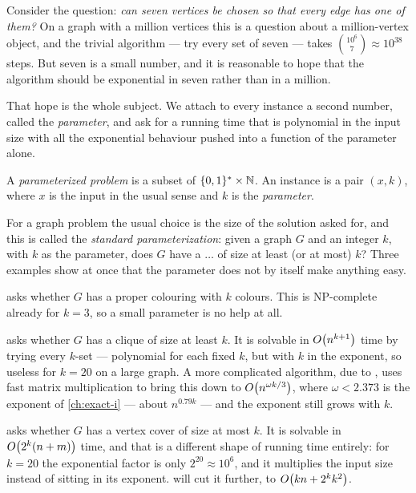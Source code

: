 Consider the question: \emph{can seven vertices be chosen so that every edge has
one of them?} On a graph with a million vertices this is a question about a
million-vertex object, and the trivial algorithm --- try every set of seven ---
takes $\binom{10^6}{7} \approx 10^{38}$ steps. But seven is a small number, and
it is reasonable to hope that the algorithm should be exponential in seven
rather than in a million.

That hope is the whole subject. We attach to every instance a second number,
called the \emph{parameter}, and ask for a running time that is polynomial in
the input size with all the exponential behaviour pushed into a function of the
parameter alone.

\begin{definition}\label{def:fpt-problem}
A \emph{parameterized problem} is a subset of $\{0,1\}^{*} \times \mathbb{N}$. An
instance is a pair $(x,k)$, where $x$ is the input in the usual sense and $k$ is
the \emph{parameter}.
\end{definition}

For a graph problem the usual choice is the size of the solution asked for, and
this is called the \emph{standard parameterization}: given a graph $G$ and an
integer $k$, with $k$ as the parameter, does $G$ have a $\ldots$ of size at
least (or at most) $k$? Three examples show at once that the parameter does not
by itself make anything easy.

\begin{example}\label{ex:fpt-three}
 asks whether $G$ has a proper colouring with $k$ colours.
This is \textrm{NP}-complete already for $k = 3$, so a small parameter is no
help at all.

 asks whether $G$ has a clique of size at least $k$. It is solvable
in $O\!\left(n^{k+1}\right)$ time by trying every $k$-set --- polynomial for each fixed
$k$, but with $k$ in the exponent, so useless for $k = 20$ on a large graph.
A more complicated algorithm, due to \citet{NesetrilPoljak1985}, uses fast
matrix multiplication to bring this down to $O\!\left(n^{\omega k/3}\right)$, where
$\omega < 2.373$ is the exponent of \cref{ch:exact-i} --- about $n^{0.79k}$ ---
and the exponent still grows with $k$.

 asks whether $G$ has a vertex cover of size at most $k$. It
is solvable in $O\!\left(2^k(n+m)\right)$ time, and that is a different shape of running
time entirely: for $k = 20$ the exponential factor is only
$2^{20} \approx 10^{6}$, and it multiplies the input size instead of sitting in
its exponent.  will cut it further, to
$O\!\left(kn + 2^k k^2\right)$.
\end{example}

